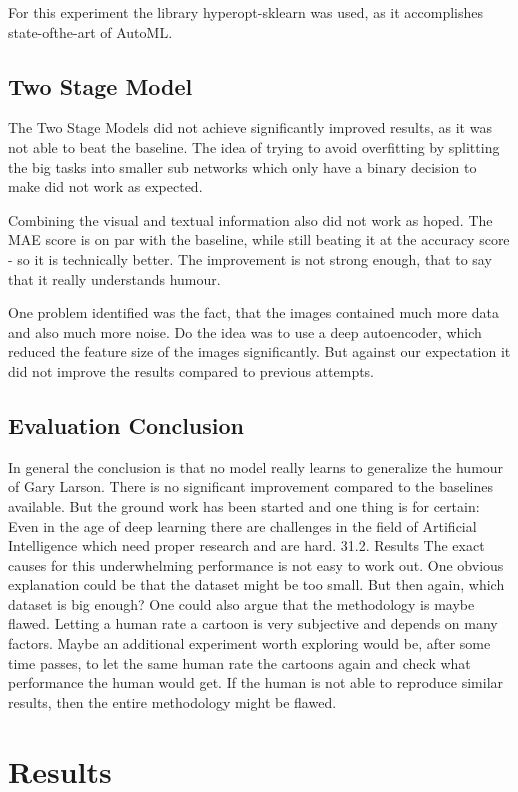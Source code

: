 \documentclass[draft,final,oneside]{vutinfth} %
\begin{document}
For this experiment the library hyperopt-sklearn was used, as it accomplishes state-ofthe-art of AutoML.

\subsection{Two Stage Model}
The Two Stage Models did not achieve significantly improved results, as it was not able
to beat the baseline. The idea of trying to avoid overfitting by splitting the big tasks into
smaller sub networks which only have a binary decision to make did not work as expected.

Combining the visual and textual information also did not work as hoped. The MAE
score is on par with the baseline, while still beating it at the accuracy score - so it is
technically better. The improvement is not strong enough, that to say that it really
understands humour.

One problem identified was the fact, that the images contained much more data and
also much more noise. Do the idea was to use a deep autoencoder, which reduced the
feature size of the images significantly. But against our expectation it did not improve
the results compared to previous attempts.

\subsection{Evaluation Conclusion}

In general the conclusion is that no model really learns to generalize the humour of
Gary Larson. There is no significant improvement compared to the baselines available.
But the ground work has been started and one thing is for certain: Even in the age of
deep learning there are challenges in the field of Artificial Intelligence which need proper
research and are hard.
31.2. Results
The exact causes for this underwhelming performance is not easy to work out. One
obvious explanation could be that the dataset might be too small. But then again, which
dataset is big enough?
One could also argue that the methodology is maybe flawed. Letting a human rate a
cartoon is very subjective and depends on many factors. Maybe an additional experiment
worth exploring would be, after some time passes, to let the same human rate the cartoons
again and check what performance the human would get. If the human is not able to
reproduce similar results, then the entire methodology might be flawed.


\section{Results}
\end{document}
